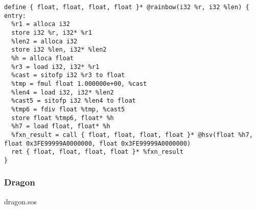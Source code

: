 \documentclass[main.tex]{subfiles}
\begin{document}
{\begin{lstlisting}
define { float, float, float, float }* @rainbow(i32 %r, i32 %len) {
entry:
  %r1 = alloca i32
  store i32 %r, i32* %r1
  %len2 = alloca i32
  store i32 %len, i32* %len2
  %h = alloca float
  %r3 = load i32, i32* %r1
  %cast = sitofp i32 %r3 to float
  %tmp = fmul float 1.000000e+00, %cast
  %len4 = load i32, i32* %len2
  %cast5 = sitofp i32 %len4 to float
  %tmp6 = fdiv float %tmp, %cast5
  store float %tmp6, float* %h
  %h7 = load float, float* %h
  %fxn_result = call { float, float, float, float }* @hsv(float %h7, float 0x3FE99999A0000000, float 0x3FE99999A0000000)
  ret { float, float, float, float }* %fxn_result
}
\end{lstlisting}
}

\newpage
\subsubsection{Dragon}
	\colorbox{blue!30}{dragon.sos}

	\begin{lstlisting}
	
	\end{lstlisting}




	
\end{document}
